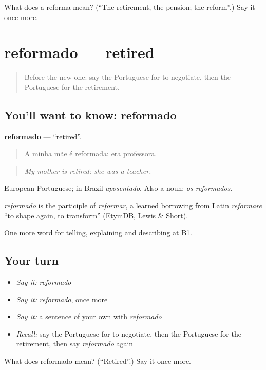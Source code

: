 \begin{tcolorbox}[breakable,colback=teal!4,colframe=teal!35!black,title={Before you move on}]
What does a reforma mean? (\textquotedblleft{}The retirement, the pension; the reform\textquotedblright{}.) Say it once more.
\end{tcolorbox}
\section[reformado]{reformado — retired}

\label{lesson:PT-C362-reformado}



\begin{quote}
Before the new one: say the Portuguese for to negotiate, then the Portuguese for the retirement.
\end{quote}

\subsection*{You'll want to know: reformado}
\textbf{reformado} — \textquotedblleft{}retired\textquotedblright{}.

\begin{quote}
A minha mãe é reformada: era professora.
\end{quote}

\begin{quote}
\emph{My mother is retired: she was a teacher.}
\end{quote}

European Portuguese; in Brazil \emph{aposentado}. Also a noun: \emph{os reformados}.

\begin{cousinweb}
\emph{reformado} is the participle of \emph{reformar}, a learned borrowing from Latin \emph{refōrmāre} \textquotedblleft{}to shape again, to transform\textquotedblright{} (EtymDB, Lewis \& Short).
\end{cousinweb}

\begin{grammarlens}[title={What you've built}]
One more word for telling, explaining and describing at B1.
\end{grammarlens}

\subsection*{Your turn}
\begin{itemize}
\raggedright
  \item \emph{Say it:} \emph{reformado}
  \item \emph{Say it:} \emph{reformado}, once more
  \item \emph{Say it:} a sentence of your own with \emph{reformado}
  \item \emph{Recall:} say the Portuguese for to negotiate, then the Portuguese for the retirement, then say \emph{reformado} again
\end{itemize}

\begin{tcolorbox}[breakable,colback=teal!4,colframe=teal!35!black,title={Before you move on}]
What does reformado mean? (\textquotedblleft{}Retired\textquotedblright{}.) Say it once more.
\end{tcolorbox}
